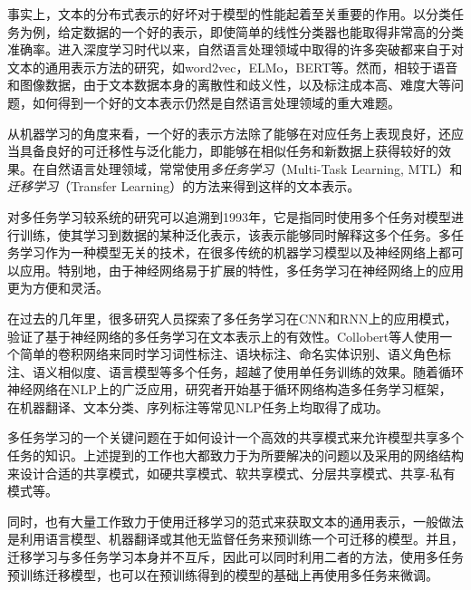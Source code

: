事实上，文本的分布式表示的好坏对于模型的性能起着至关重要的作用。以分类任务为例，给定数据的一个好的表示，即使简单的线性分类器也能取得非常高的分类准确率\cite{tenney2018you}\cite{liu2019linguistic}。进入深度学习时代以来，自然语言处理领域中取得的许多突破都来自于对文本的通用表示方法的研究，如word2vec\cite{DBLP:conf/nips/MikolovSCCD13}，ELMo\cite{DBLP:conf/naacl/PetersNIGCLZ18}，BERT\cite{devlin2018bert}等。然而，相较于语音和图像数据，由于文本数据本身的离散性和歧义性，以及标注成本高、难度大等问题，如何得到一个好的文本表示仍然是自然语言处理领域的重大难题。

从机器学习的角度来看，一个好的表示方法除了能够在对应任务上表现良好，还应当具备良好的可迁移性与泛化能力，即能够在相似任务和新数据上获得较好的效果。在自然语言处理领域，常常使用\emph{多任务学习}（Multi-Task Learning, MTL）和\emph{迁移学习}（Transfer Learning）的方法来得到这样的文本表示\cite{devlin2018bert}\cite{DBLP:conf/icml/CollobertW08}。

对多任务学习较系统的研究可以追溯到1993年\cite{DBLP:conf/icml/Caruana93}，它是指同时使用多个任务对模型进行训练，使其学习到数据的某种泛化表示，该表示能够同时解释这多个任务。多任务学习作为一种模型无关的技术，在很多传统的机器学习模型以及神经网络上都可以应用。特别地，由于神经网络易于扩展的特性，多任务学习在神经网络上的应用更为方便和灵活。

在过去的几年里，很多研究人员探索了多任务学习在CNN和RNN上的应用模式，验证了基于神经网络的多任务学习在文本表示上的有效性。Collobert等人\cite{DBLP:conf/icml/CollobertW08}使用一个简单的卷积网络来同时学习词性标注、语块标注、命名实体识别、语义角色标注、语义相似度、语言模型等多个任务，超越了使用单任务训练的效果。随着循环神经网络在NLP上的广泛应用，研究者开始基于循环网络构造多任务学习框架，在机器翻译\cite{DBLP:conf/acl/DongWHYW15}、文本分类\cite{DBLP:conf/ijcai/LiuQH16}\cite{DBLP:conf/acl/LiuQH17}、序列标注\cite{DBLP:conf/acl/SogaardG16}等常见NLP任务上均取得了成功。

多任务学习的一个关键问题在于如何设计一个高效的共享模式来允许模型共享多个任务的知识。上述提到的工作也大都致力于为所要解决的问题以及采用的网络结构来设计合适的共享模式，如硬共享模式、软共享模式、分层共享模式、共享-私有模式等。

同时，也有大量工作致力于使用迁移学习的范式来获取文本的通用表示，一般做法是利用语言模型\cite{DBLP:conf/naacl/PetersNIGCLZ18}\cite{radford2018improving}、机器翻译\cite{DBLP:conf/nips/McCannBXS17}或其他无监督任务\cite{devlin2018bert}来预训练一个可迁移的模型。并且，迁移学习与多任务学习本身并不互斥，因此可以同时利用二者的方法，使用多任务预训练迁移模型\cite{DBLP:conf/iclr/SubramanianTBP18}，也可以在预训练得到的模型的基础上再使用多任务来微调\cite{liu2019multi}\cite{anonymous2018bam!}。

